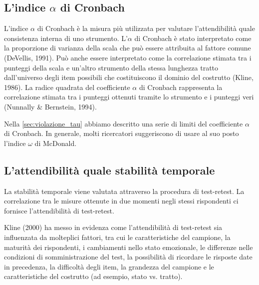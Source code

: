 \subsection{L'indice $\alpha$ di Cronbach}

L'indice $\alpha$ di Cronbach è la misura più utilizzata per valutare l'attendibilità quale consistenza interna di uno strumento. L'$\alpha$ di Cronbach è stato interpretato come la proporzione di varianza della scala che può essere attribuita al fattore comune 
(DeVellis, 1991). Può anche essere interpretato come la correlazione stimata tra i punteggi della scala e un'altro strumento della stessa lunghezza tratto dall'universo degli item possibili che costituiscono il dominio del costrutto (Kline, 1986). La radice quadrata del coefficiente $\alpha$ di Cronbach rappresenta la correlazione stimata tra i punteggi ottenuti tramite lo strumento e i punteggi veri (Nunnally \& Bernstein, 1994).

Nella \ref{sec:violazione_tau} abbiamo descritto una serie di limiti del coefficiente $\alpha$ di Cronbach.  In generale, molti ricercatori suggeriscono di usare al suo posto l'indice $\omega$ di McDonald.

\subsection{L'attendibilità quale stabilità temporale}

La stabilità temporale viene valutata attraverso la procedura di test-retest. La correlazione tra le misure ottenute in due momenti negli stessi rispondenti ci fornisce l'attendibilità di test-retest. 

Kline (2000) ha messo in evidenza come l'attendibilità di test-retest sia influenzata da molteplici fattori, tra cui le caratteristiche del campione, la maturità dei rispondenti, i cambiamenti nello stato emozionale, le differenze nelle condizioni di somministrazione del test, la possibilità di ricordare le risposte date in precedenza, la difficoltà degli item, la grandezza del campione e le caratteristiche del costrutto (ad esempio, stato vs. tratto).

